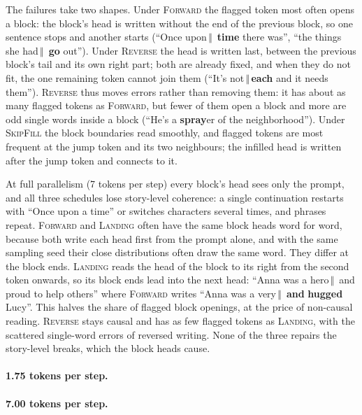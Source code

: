 \documentclass{article}
\theoremstyle{definition}
\theoremstyle{remark}
\newcommand{\name}[1]{\textup{\textsc{#1}}}
\newcommand{\sfill}{\name{SkipFill}\xspace}
\newcommand{\rev}{\name{Reverse}\xspace}
\newcommand{\fwd}{\name{Forward}\xspace}
\newcommand{\landing}{\name{Landing}\xspace}
\newcommand{\blk}{\,{\color{black!45}$\Vert$}\,}
\newcommand{\brk}[1]{\textbf{\color{red!65!black}#1}}
\begin{document}
The failures take two shapes.
Under \fwd the flagged token most often opens a block: the block's head is written without the end of the previous block, so one sentence stops and another starts (``Once upon\blk{} \brk{time} there was'', ``the things she had\blk{} \brk{go} out'').
Under \rev the head is written last, between the previous block's tail and its own right part; both are already fixed, and when they do not fit, the one remaining token cannot join them (``It's not\blk{}\brk{each} and it needs them'').
\rev thus moves errors rather than removing them: it has about as many flagged tokens as \fwd, but fewer of them open a block and more are odd single words inside a block (``He's a \brk{spray}er of the neighborhood'').
Under \sfill the block boundaries read smoothly, and flagged tokens are most frequent at the jump token and its two neighbours; the infilled head is written after the jump token and connects to it.

At full parallelism (7 tokens per step) every block's head sees only the prompt, and all three schedules lose story-level coherence: a single continuation restarts with ``Once upon a time'' or switches characters several times, and phrases repeat.
\fwd and \landing often have the same block heads word for word, because both write each head first from the prompt alone, and with the same sampling seed their close distributions often draw the same word.
They differ at the block ends.
\landing reads the head of the block to its right from the second token onwards, so its block ends lead into the next head: ``Anna was a hero\blk{} and proud to help others'' where \fwd writes ``Anna was a very\blk{} \brk{and} \brk{hugged} Lucy''.
This halves the share of flagged block openings, at the price of non-causal reading.
\rev stays causal and has as few flagged tokens as \landing, with the scattered single-word errors of reversed writing.
None of the three repairs the story-level breaks, which the block heads cause.

{\small
\paragraph{1.75 tokens per step.}

\paragraph{7.00 tokens per step.}

}

\end{document}
